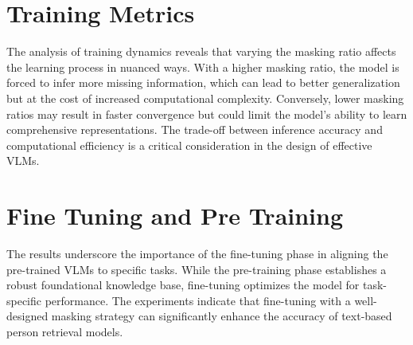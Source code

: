 \section{Training Metrics}

The analysis of training dynamics reveals that varying the masking ratio affects the learning process in nuanced ways. With a higher masking ratio, the model is forced to infer more missing information, which can lead to better generalization but at the cost of increased computational complexity. Conversely, lower masking ratios may result in faster convergence but could limit the model's ability to learn comprehensive representations. The trade-off between inference accuracy and computational efficiency is a critical consideration in the design of effective VLMs.

\section{Fine Tuning and Pre Training}

The results underscore the importance of the fine-tuning phase in aligning the pre-trained VLMs to specific tasks. While the pre-training phase establishes a robust foundational knowledge base, fine-tuning optimizes the model for task-specific performance. The experiments indicate that fine-tuning with a well-designed masking strategy can significantly enhance the accuracy of text-based person retrieval models.





